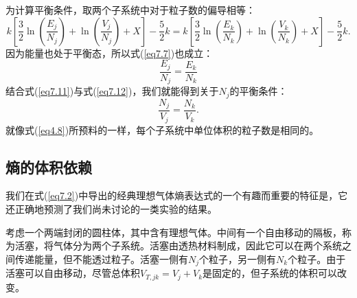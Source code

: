 \documentclass[UTF8]{ctexart}
\numberwithin{equation}{section}%
\numberwithin{figure}{section}%
\begin{document}
    为计算平衡条件，取两个子系统中对于粒子数的偏导相等：
    \begin{equation}\label{eq7.11}
        k\left[\frac{3}{2} \ln \left(\frac{E_{j}}{N_{j}}\right)+\ln \left(\frac{V_{j}}{N_{j}}\right)+X\right]-\frac{5}{2} k=k\left[\frac{3}{2} \ln \left(\frac{E_{k}}{N_{k}}\right)+\ln \left(\frac{V_{k}}{N_{k}}\right)+X\right]-\frac{5}{2} k .
    \end{equation}
    因为能量也处于平衡态，所以式(\ref{eq7.7})也成立：
    \begin{equation}\label{eq7.12}
        \frac{E_{j}}{N_{j}}=\frac{E_{k}}{N_{k}}
    \end{equation}
    结合式(\ref{eq7.11})与式(\ref{eq7.12})，我们就能得到关于$N_j$的平衡条件：
    \begin{equation}
        \frac{N_{j}}{V_{j}}=\frac{N_{k}}{V_{k}} .
    \end{equation}
    就像式(\ref{eq4.8})所预料的一样，每个子系统中单位体积的粒子数是相同的。

    \subsection{熵的体积依赖}
    我们在式(\ref{eq7.2})中导出的经典理想气体熵表达式的一个有趣而重要的特征是，它还正确地预测了我们尚未讨论的一类实验的结果。

    考虑一个两端封闭的圆柱体，其中含有理想气体。中间有一个自由移动的隔板，称为活塞，将气体分为两个子系统。活塞由透热材料制成，因此它可以在两个系统之间传递能量，但不能透过粒子。活塞一侧有$N_j$个粒子，另一侧有$N_k$个粒子。由于活塞可以自由移动，尽管总体积$V_{T,jk}=V_j+V_k$是固定的，但子系统的体积可以改变。
\end{document}
